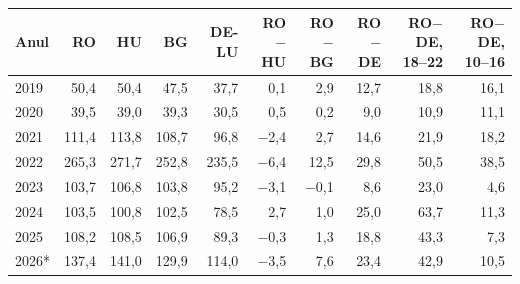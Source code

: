 \begin{tabular}{lrrrrrrrrr}
\toprule
Anul & RO & HU & BG & DE-LU & RO$-$HU & RO$-$BG & RO$-$DE & RO$-$DE, 18--22 & RO$-$DE, 10--16 \\
\midrule
2019 & 50,4 & 50,4 & 47,5 & 37,7 & 0,1 & 2,9 & 12,7 & 18,8 & 16,1 \\
2020 & 39,5 & 39,0 & 39,3 & 30,5 & 0,5 & 0,2 & 9,0 & 10,9 & 11,1 \\
2021 & 111,4 & 113,8 & 108,7 & 96,8 & $-$2,4 & 2,7 & 14,6 & 21,9 & 18,2 \\
2022 & 265,3 & 271,7 & 252,8 & 235,5 & $-$6,4 & 12,5 & 29,8 & 50,5 & 38,5 \\
2023 & 103,7 & 106,8 & 103,8 & 95,2 & $-$3,1 & $-$0,1 & 8,6 & 23,0 & 4,6 \\
2024 & 103,5 & 100,8 & 102,5 & 78,5 & 2,7 & 1,0 & 25,0 & 63,7 & 11,3 \\
2025 & 108,2 & 108,5 & 106,9 & 89,3 & $-$0,3 & 1,3 & 18,8 & 43,3 & 7,3 \\
2026* & 137,4 & 141,0 & 129,9 & 114,0 & $-$3,5 & 7,6 & 23,4 & 42,9 & 10,5 \\
\bottomrule
\end{tabular}
